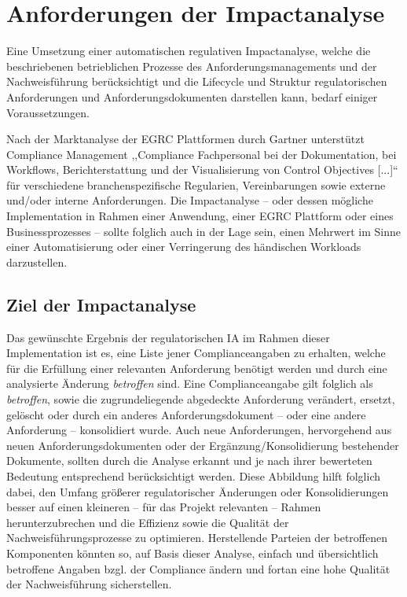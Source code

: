 \chapter{Anforderungen der Impactanalyse}

    Eine Umsetzung einer automatischen regulativen Impactanalyse, welche die beschriebenen betrieblichen Prozesse des Anforderungsmanagements und der Nachweisführung berücksichtigt und die Lifecycle und Struktur regulatorischen Anforderungen und Anforderungsdokumenten darstellen kann, bedarf einiger Voraussetzungen.  

    \medskip
    Nach der Marktanalyse der \ac{EGRC} Plattformen durch Gartner \cite{app_gartner} unterstützt Compliance Management ,,Compliance Fachpersonal bei der Dokumentation, bei Workflows, Berichterstattung und der Visualisierung von Control Objectives [...]``\cite[S. 4 (übersetzt)]{app_gartner} für verschiedene branchenspezifische Regularien, Vereinbarungen sowie externe und/oder interne Anforderungen.       
    Die Impactanalyse -- oder dessen mögliche Implementation in Rahmen einer Anwendung, einer \ac{EGRC} Plattform oder eines Businessprozesses -- sollte folglich auch in der Lage sein, einen Mehrwert im Sinne einer Automatisierung oder einer Verringerung des händischen Workloads darzustellen.

\section{Ziel der Impactanalyse}
    
    Das gewünschte Ergebnis der regulatorischen \acf{IA} im Rahmen dieser Implementation ist es, eine Liste jener Complianceangaben zu erhalten, welche für die Erfüllung einer relevanten Anforderung benötigt werden und durch eine analysierte Änderung \textit{betroffen} sind. 
    Eine Complianceangabe gilt folglich als \textit{betroffen}, sowie die zugrundeliegende abgedeckte Anforderung verändert, ersetzt, gelöscht oder durch ein anderes Anforderungsdokument -- oder eine andere Anforderung -- konsolidiert wurde.
    Auch neue Anforderungen, hervorgehend aus neuen Anforderungsdokumenten oder der Ergänzung/Konsolidierung bestehender Dokumente, sollten durch die Analyse erkannt und je nach ihrer bewerteten Bedeutung entsprechend berücksichtigt werden.   
    Diese Abbildung hilft folglich dabei, den Umfang größerer regulatorischer Änderungen oder Konsolidierungen besser auf einen kleineren -- für das Projekt relevanten -- Rahmen herunterzubrechen und die Effizienz sowie die Qualität der Nachweisführungsprozesse zu optimieren. 
    Herstellende Parteien der betroffenen Komponenten könnten so, auf Basis dieser Analyse, einfach und übersichtlich betroffene Angaben bzgl. der Compliance ändern und fortan eine hohe Qualität der Nachweisführung sicherstellen.

